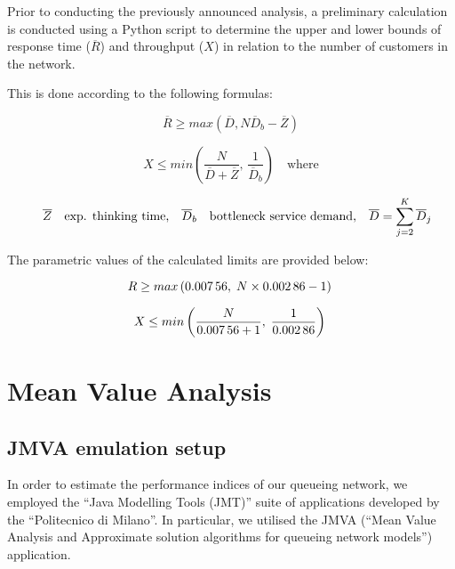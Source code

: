 Prior to conducting the previously announced analysis, a preliminary calculation is conducted using a Python script to determine the upper and lower bounds of response time ($\overline{R}$) and throughput ($X$) in relation to the number of customers in the network.

This is done according to the following formulas:

\begin{equation}
	\label{eq:asymptotic-bounds-expected-response-time}
	\overline{R} \geq max\left(\overline{D},N\overline{D}_b-\overline{Z}\right)
\end{equation}

\begin{equation}
	\label{eq:asymptotic-bounds-throughput}
	X \leq min\left(\frac{N}{\overline{D}+\overline{Z}},\,\frac{1}{\overline{D}_b}\right) \quad \text{where}
\end{equation}

\[
	\quad \overline{Z} \quad \text{exp. thinking time,} \quad \overline{D}_b \quad \text{bottleneck service demand,} \quad \overline{D} = \sum^{K}_{j=2}\overline{D}_{j}  \\
\]

The parametric values of the calculated limits are provided below:

\[
 R \geq max\left(\num[round-mode=places, round-precision=5]{0.00756138888888889},\;N\times\num[round-mode=places, round-precision=5]{0.00286250000000000}-1\right) \\
\]

\[
 X \leq min\left(\frac{N}{\num[round-mode=places, round-precision=5]{0.00756138888888889}+1},\;\frac{1}{\num[round-mode=places, round-precision=5]{0.00286250000000000}}\right) \\
\]

\section{Mean Value Analysis}

\subsection{JMVA emulation setup}

In order to estimate the performance indices of our queueing network, we employed the ``Java Modelling Tools (JMT)'' suite of applications developed by the ``Politecnico di Milano''.
In particular, we utilised the JMVA (``Mean Value Analysis and Approximate solution algorithms for queueing network models'') application.

